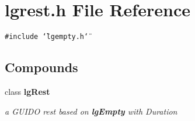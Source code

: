 \section{lgrest.h File Reference}
\label{lgrest_8h}
{\tt \#include \char`\"{}lgempty.h\char`\"{}}\par
\subsection*{Compounds}
\begin{CompactItemize}
\item 
class {\bf lg\-Rest}
\begin{CompactList}\small\item\em a GUIDO rest based on {\bf lg\-Empty} with Duration \item\end{CompactList}\end{CompactItemize}
